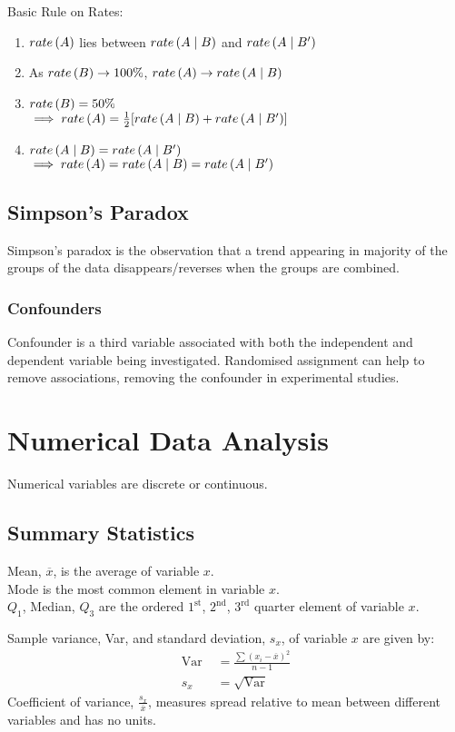 \documentclass[12pt, a4paper]{article}
\begin{document}
\begin{multicols*}{3}
Basic Rule on Rates:
\begin{enumerate}[\roman*.]
  \item $\mathord{rate} \left( A \right)$ lies between $\mathord{rate} \left( A\mid B \right)$ and $\mathord{rate} \left( A\mid B' \right)$
  \item As $\mathord{rate} \left( B \right) \rightarrow 100\%$, $\mathord{rate} \left( A \right) \rightarrow \mathord{rate} \left( A\mid B \right)$
  \item $\mathord{rate} \left( B \right) = 50\%$ \\$\implies \mathord{rate} \left( A \right) = \frac{1}{2}[\mathord{rate} \left( A\mid B \right) + \mathord{rate} \left( A\mid B' \right)]$
  \item $\mathord{rate} \left( A\mid B \right) = \mathord{rate} \left( A\mid B' \right)$\\$\implies \mathord{rate} \left( A \right) = \mathord{rate} \left( A\mid B \right) = \mathord{rate} \left( A\mid B' \right)$
\end{enumerate}

\subsection{Simpson's Paradox}
Simpson's paradox is the observation that a trend appearing in majority of the groups of the data disappears/reverses when the groups are combined.

\subsubsection{Confounders}
Confounder is a third variable associated with both the independent and dependent variable being investigated. Randomised assignment can help to remove associations, removing the confounder in experimental studies.

\section{Numerical Data Analysis}
Numerical variables are discrete or continuous.

\subsection{Summary Statistics}
Mean, $\overline{x}$, is the average of variable $x$.\\
Mode is the most common element in variable $x$.\\
$Q_1$, Median, $Q_3$ are the ordered  $1^{\text{st}}$, $2^{\text{nd}}$, $3^{\text{rd}}$ quarter element of variable $x$.

Sample variance, Var, and standard deviation, $s_x$, of variable $x$ are given by: 
\begin{align*}
  \text{Var }&= \frac{\sum (x_i-\overline{x})^2}{n-1}\\
  s_x &= \sqrt{\text{Var}}
\end{align*}
Coefficient of variance, $\displaystyle \frac{s_x}{\overline{x}}$, measures spread relative to mean between different variables and has no units.


\end{multicols*}
\end{document}
